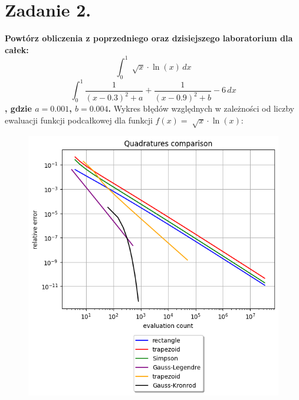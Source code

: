 \documentclass{article}
\begin{document}
\section*{Zadanie 2.}
\textbf{Powtórz obliczenia z poprzedniego oraz dzisiejszego laboratorium
dla całek:
$$ \int_{0}^{1} \sqrt[]{x}\cdot \ln(x) \,dx $$
$$ \int_{0}^{1} \frac{1}{(x-0.3)^2 + a} + \frac{1}{(x-0.9)^2 + b} - 6\,dx $$
, gdzie $a=0.001$, $b=0.004$.}
\newpage
Wykres błędów względnych w zależności od liczby ewaluacji
funkcji podcałkowej dla funkcji $f(x) = \sqrt[]{x}\cdot \ln(x)$:
\begin{figure}[H]
  \includegraphics[width=\linewidth]{figures/quad_g.png}
\end{figure}
\end{document}
